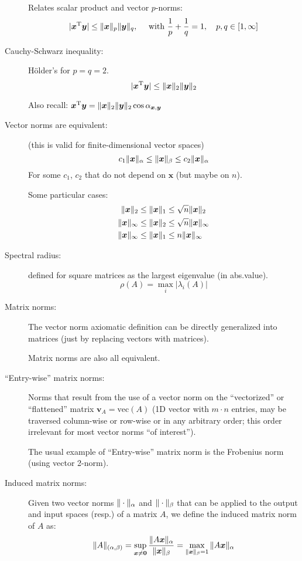 \documentclass[
  12pt,
  paper=a4,
]{scrartcl} %
\begin{document}
\begin{description}
Relates scalar product and vector $p$-norms:
\[
|\bm x^{\mathrm{T}} \bm y| \le \|\bm x\|_p\|\bm y\|_q, \quad \text{ with }\frac{1}{p}+\frac{1}{q} = 1, \quad p, q\in [1,\infty]
\]

\item[Cauchy-Schwarz inequality:]
H\"older's for $p=q=2$.
\[
|\bm x^{\mathrm{T}} \bm y| \le \|\bm x\|_2\|\bm y\|_2
\]

Also recall: $
\bm x^{\mathrm{T}} \bm y =
    \|\bm x\|_2\|\bm y\|_2 \cos \alpha_{\bm x,\bm y}$

\newpage
\item[Vector norms are equivalent:] (this is valid for finite-dimensional vector spaces)
\[
    c_1 \|\bm x\|_\alpha \le
        \|\bm x\|_\beta  \le
    c_2 \|\bm x\|_\alpha
\]
For some $c_1$, $c_2$ that do not depend on $\bm x$ (but maybe on $n$).

Some particular cases:
\begin{align*}
    \|\bm x\|_2 &\le \|\bm x\|_1 \le \sqrt{n}\|\bm x\|_2
    \\
    \|\bm x\|_\infty &\le \|\bm x\|_2 \le \sqrt{n}\|\bm x\|_\infty
    \\
    \|\bm x\|_\infty &\le \|\bm x\|_1 \le n\|\bm x\|_\infty
\end{align*}

\item[Spectral radius:] defined for square matrices as the largest eigenvalue (in abs.\@ value).
\[\rho(A) = \max_i |\lambda_i(A)| \]

\item[Matrix norms:]
The vector norm axiomatic definition can be directly generalized into matrices (just by replacing vectors with matrices).

Matrix norms are also all equivalent.

\item[``Entry-wise'' matrix norms:]
Norms that result from the use of a vector norm on the ``vectorized'' or ``flattened'' matrix $\bm v_A = \mathrm{vec}(A)$ (1D vector with $m\cdot n$ entries, may be traversed column-wise or row-wise or in any arbitrary order; this order irrelevant for most vector norms ``of interest'').

The usual example of ``Entry-wise'' matrix norm is the Frobenius norm (using vector 2-norm).

\item[Induced matrix norms:]
Given two vector norms $\|\cdot\|_\alpha$ and $\|\cdot\|_\beta$ that can be applied to the output and input spaces (resp.) of a matrix $A$, we define the induced matrix norm of $A$ as:
\[
\|A\|_{(\alpha,\beta)}
=
\sup_{\bm x\neq \bm 0}
    \frac{\|A\bm x\|_\alpha}{\|\bm x\|_\beta}
=
\max_{\|\bm x\|_{\beta}=1}
    {\|A\bm x\|_\alpha}
\]


\end{description}
\end{document}
